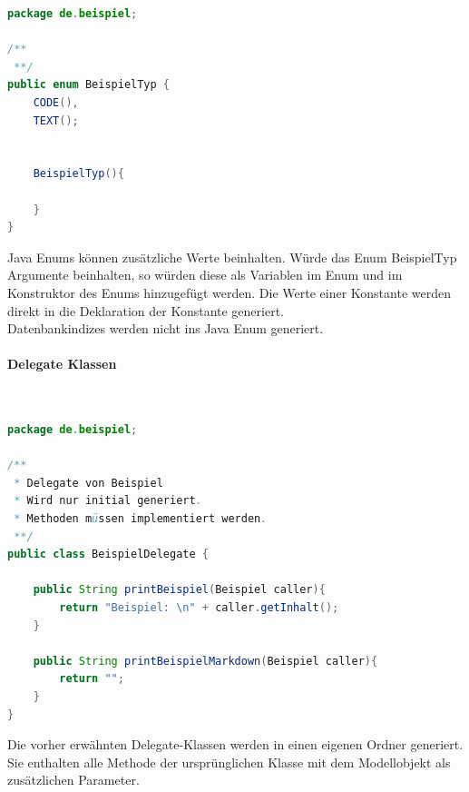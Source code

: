 \documentclass[./einleitung.tex]{subfiles}
\begin{document}
    \newpage
    \begin{lstlisting}[language=Java, caption=BeispielTyp.java, label=lst:beispielTypJava]
package de.beispiel;

/**
 **/
public enum BeispielTyp {
    CODE(),
    TEXT();


    BeispielTyp(){

    }
}
    \end{lstlisting}
    Java Enums können zusätzliche Werte beinhalten.
    Würde das Enum BeispielTyp Argumente beinhalten, so würden diese als Variablen im Enum und im Konstruktor des Enums hinzugefügt werden.
    Die Werte einer Konstante werden direkt in die Deklaration der Konstante generiert.\\
    Datenbankindizes werden nicht ins Java Enum generiert.
    
    \paragraph{Delegate Klassen}\mbox{}\\
    \begin{lstlisting}[language=Java, caption=BeispielDelegate.java, label=lst:beispielDelegateJava]
package de.beispiel;

/**
 * Delegate von Beispiel
 * Wird nur initial generiert.
 * Methoden müssen implementiert werden.
 **/
public class BeispielDelegate {

    public String printBeispiel(Beispiel caller){
        return "Beispiel: \n" + caller.getInhalt();
    }

    public String printBeispielMarkdown(Beispiel caller){
        return "";
    }
}
    \end{lstlisting}
    Die vorher erwähnten Delegate-Klassen werden in einen eigenen Ordner generiert.
    Sie enthalten alle Methode der ursprünglichen Klasse mit dem Modellobjekt als zusätzlichen Parameter.
\end{document}
